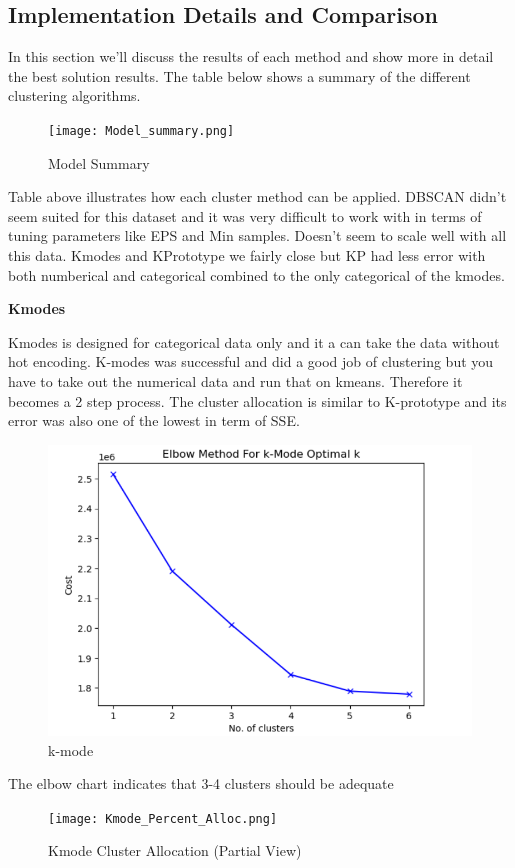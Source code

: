\documentclass[conference]{IEEEtran}
\begin{document}
\subsection{Implementation Details and Comparison}

 
In this section we'll discuss the results of each method and show more in detail the best solution results.  The table below shows a summary of the different clustering algorithms.
\begin{figure}[!h]
	\texttt{[image: Model\_summary.png]}
	\caption{Model Summary}
	\label{fig: Model_summary}
\end{figure}

Table above illustrates how each cluster method can be applied.  DBSCAN didn't seem suited for this dataset and it was very difficult to work with in terms of tuning parameters like EPS and Min samples.  Doesn't seem to scale well with all this data.  Kmodes and KPrototype we fairly close but KP had less error with both numberical and categorical combined to the only categorical of the kmodes.  

\begin{center} 
\textbf{Kmodes} 
\end{center}
Kmodes is designed for categorical data only and it a can take the data without hot encoding.  K-modes was successful and did a good job of clustering but you have to take out the numerical data and run that on kmeans.  Therefore it becomes a 2 step process.  The cluster allocation is similar to K-prototype and its error was also one of the lowest in term of SSE.

\begin{figure}[!h]
	\includegraphics[width=\linewidth]{k_mode_elbow.png}
	\caption{k-mode}
	\label{fig: Kmode Elbow Chart}
 \end{figure}
The elbow chart indicates that 3-4 clusters should be adequate
\begin{figure}[!h]
	\texttt{[image: Kmode\_Percent\_Alloc.png]}
	\caption{Kmode Cluster Allocation (Partial View)}
	\label{fig: Kmode Cluster Allocation (Partial View)}
 \end{figure}
\end{document}
